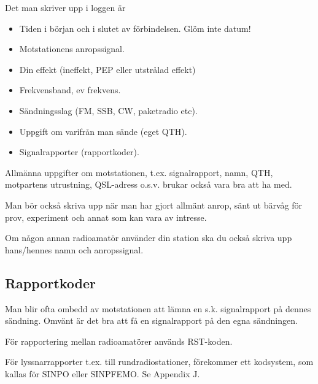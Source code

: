 Det man skriver upp i loggen är
\begin{itemize}
\item Tiden i början och i slutet av förbindelsen. Glöm inte datum!
\item Motstationens anropssignal.
\item Din effekt (ineffekt, PEP eller utstrålad effekt)
\item Frekvensband, ev frekvens.
\item Sändningsslag (FM, SSB, CW, paketradio etc).
\item Uppgift om varifrån man sände (eget QTH).
\item Signalrapporter (rapportkoder).
\end{itemize}

Allmänna uppgifter om motstationen, t.ex. signalrapport, namn, QTH,
motpartens utrustning, QSL-adress o.s.v. brukar också vara bra att ha
med.

Man bör också skriva upp när man har gjort allmänt anrop, sänt ut
bärvåg för prov, experiment och annat som kan vara av intresse.

Om någon annan radioamatör använder din station ska du också skriva
upp hans/hennes namn och anropssignal.

\subsection{Rapportkoder}

Man blir ofta ombedd av motstationen att lämna en s.k. signalrapport
på dennes sändning. Omvänt är det bra att få en signalrapport på den
egna sändningen.

För rapportering mellan radioamatörer används RST-koden.

För lyssnarrapporter t.ex. till rundradiostationer, förekommer ett
kodsystem, som kallas för SINPO eller SINPFEMO. Se Appendix J.

